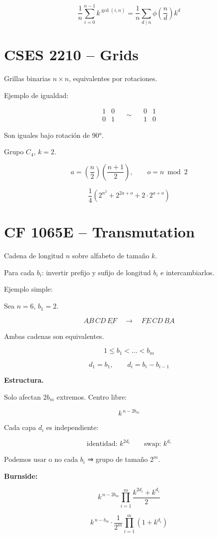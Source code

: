 \documentclass[10pt,twocolumn]{article}
\begin{document}
\[
\boxed{
\frac{1}{n}\sum_{i=0}^{n-1} k^{\gcd(i,n)}
=
\frac{1}{n}\sum_{d\mid n}\phi\!\left(\frac{n}{d}\right)k^d
}
\]


\section*{CSES 2210 -- Grids}

Grillas binarias \(n\times n\),
equivalentes por rotaciones.

Ejemplo de igualdad:

\[
\begin{matrix}
1 & 0 \\
0 & 1
\end{matrix}
\quad\sim\quad
\begin{matrix}
0 & 1 \\
1 & 0
\end{matrix}
\]

Son iguales bajo rotación de 90°.

Grupo \(C_4\), \(k=2\).

\[
a=\left(\frac{n}{2}\right)\left(\frac{n+1}{2}\right),
\qquad
o=n\bmod 2
\]

\[
\boxed{
\frac{1}{4}
\left(
2^{n^2}
+
2^{2a+o}
+
2\cdot 2^{a+o}
\right)
}
\]


\section*{CF 1065E -- Transmutation}

Cadena de longitud \(n\) sobre alfabeto de tamaño \(k\).

Para cada \(b_i\): invertir prefijo y sufijo de longitud \(b_i\) e intercambiarlos.

Ejemplo simple:

Sea \(n=6\), \(b_1=2\).

\[
\underline{AB} \, C D \, \underline{EF}
\quad\longrightarrow\quad
\underline{FE} \, C D \, \underline{BA}
\]

Ambas cadenas son equivalentes.

\[
1\le b_1<\dots<b_m
\]

\[
d_1=b_1,\qquad d_i=b_i-b_{i-1}
\]

\textbf{Estructura.}

Solo afectan \(2b_m\) extremos.  
Centro libre:

\[
k^{\,n-2b_m}
\]

Cada capa \(d_i\) es independiente:

\[
\text{identidad: } k^{2d_i}
\qquad
\text{swap: } k^{d_i}
\]

Podemos usar o no cada \(b_i\) ⇒ grupo de tamaño \(2^m\).

\textbf{Burnside:}

\[
\boxed{
k^{\,n-2b_m}
\prod_{i=1}^{m}
\frac{k^{2d_i}+k^{d_i}}{2}
}
\]

\[
\boxed{
k^{\,n-b_m}
\cdot
\frac{1}{2^{m}}
\prod_{i=1}^{m}(1+k^{d_i})
}
\]
\end{document}
